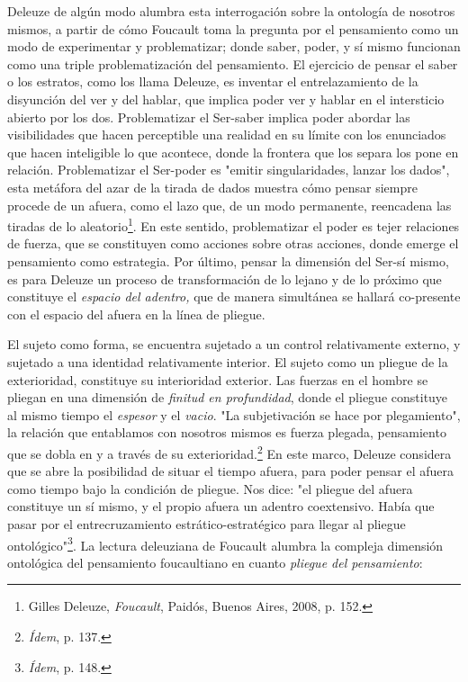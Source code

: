 \documentclass{book}
\begin{document}
Deleuze de algún modo alumbra esta interrogación sobre la ontología de
nosotros mismos, a partir de cómo Foucault toma la pregunta por el
pensamiento como un modo de experimentar y problematizar; donde saber,
poder, y sí mismo funcionan como una triple problematización del
pensamiento. El ejercicio de pensar el saber o los estratos, como los
llama Deleuze, es inventar el entrelazamiento de la disyunción del ver y
del hablar, que implica poder ver y hablar en el intersticio abierto por
los dos. Problematizar el Ser-saber implica poder abordar las
visibilidades que hacen perceptible una realidad en su límite con los
enunciados que hacen inteligible lo que acontece, donde la frontera que
los separa los pone en relación. Problematizar el Ser-poder es "emitir
singularidades, lanzar los dados", esta metáfora del azar de la tirada
de dados muestra cómo pensar siempre procede de un afuera, como el lazo
que, de un modo permanente, reencadena las tiradas de lo
aleatorio\footnote{Gilles Deleuze, \emph{Foucault}, Paidós, Buenos
  Aires, 2008, p. 152.}. En este sentido, problematizar el poder es
tejer relaciones de fuerza, que se constituyen como acciones sobre otras
acciones, donde emerge el pensamiento como estrategia. Por último,
pensar la dimensión del Ser-sí mismo, es para Deleuze un proceso de
transformación de lo lejano y de lo próximo que constituye el
\emph{espacio del adentro,} que de manera simultánea se hallará
co-presente con el espacio del afuera en la línea de pliegue.

El sujeto como forma, se encuentra sujetado a un control relativamente
externo, y sujetado a una identidad relativamente interior. El sujeto
como un pliegue de la exterioridad, constituye su interioridad exterior.
Las fuerzas en el hombre se pliegan en una dimensión de \emph{finitud en
profundidad}, donde el pliegue constituye al mismo tiempo el
\emph{espesor} y el \emph{vacio}. "La subjetivación se hace por
plegamiento", la relación que entablamos con nosotros mismos es fuerza
plegada, pensamiento que se dobla en y a través de su
exterioridad.\footnote{\emph{Ídem}, p. 137.} En este marco, Deleuze
considera que se abre la posibilidad de situar el tiempo afuera, para
poder pensar el afuera como tiempo bajo la condición de pliegue. Nos
dice: "el pliegue del afuera constituye un sí mismo, y el propio afuera
un adentro coextensivo. Había que pasar por el entrecruzamiento
estrático-estratégico para llegar al pliegue ontológico"\footnote{\emph{Ídem},
  p. 148.}. La lectura deleuziana de Foucault alumbra la compleja
dimensión ontológica del pensamiento foucaultiano en cuanto
\emph{pliegue del pensamiento}:
\end{document}
